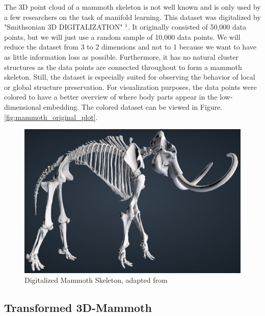 The 3D point cloud of a mammoth skeleton is not well known and is only used by a few researchers on the task of manifold learning. This dataset was digitalized by "Smithsonian 3D DIGITALIZATION" $^1$. It originally consisted of 50,000 data points, but we will just use a random sample of 10,000 data points. We will reduce the dataset from 3 to 2 dimensions and not to 1 because we want to have as little information loss as possible. Furthermore, it has no natural cluster structures as the data points are connected throughout to form a mammoth skeleton. Still, the dataset is especially suited for observing the behavior of local or global structure preservation. For visualization purposes, the data points were colored to have a better overview of where body parts appear in the low-dimensional embedding. The colored dataset can be viewed in Figure. \ref{fig:mammoth_original_plot}. \cite{mammoth}
\begin{figure}[!]
	\centering
	\includegraphics[width=0.9\columnwidth]{images/mammoth-skelleton.jpg}
	\caption[3D Mammoth Skeleton]{Digitalized Mammoth Skeleton, adapted from \footnotemark}
    \label{fig:mammoth-skelleton}
\end{figure}

\subsection{Transformed 3D-Mammoth}

